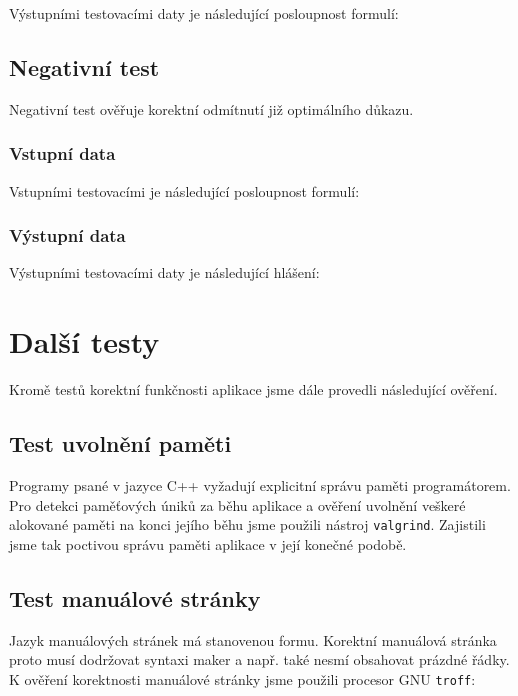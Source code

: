 \documentclass[thesis=B,czech,hidelinks]{thesis}[2012/06/26]
\begin{document}
Výstupními testovacími daty je následující posloupnost formulí:



\subsection{Negativní test}

Negativní test ověřuje korektní odmítnutí již optimálního důkazu.

\subsubsection{Vstupní data}

Vstupními testovacími je následující posloupnost formulí:



\subsubsection{Výstupní data}

Výstupními testovacími daty je následující hlášení:



\section{Další testy}

Kromě testů korektní funkčnosti aplikace jsme dále provedli následující ověření.

\subsection{Test uvolnění paměti}

Programy psané v jazyce C++ vyžadují explicitní správu paměti programátorem. Pro detekci paměťových úniků za běhu aplikace a ověření uvolnění veškeré alokované paměti na konci jejího běhu jsme použili nástroj \texttt{valgrind}. Zajistili jsme tak poctivou správu paměti aplikace v její konečné podobě.

\subsection{Test manuálové stránky}

Jazyk manuálových stránek má stanovenou formu. Korektní manuálová stránka proto musí dodržovat syntaxi maker a např. také nesmí obsahovat prázdné řádky. K ověření korektnosti manuálové stránky jsme použili procesor GNU \texttt{troff}:
\end{document}

